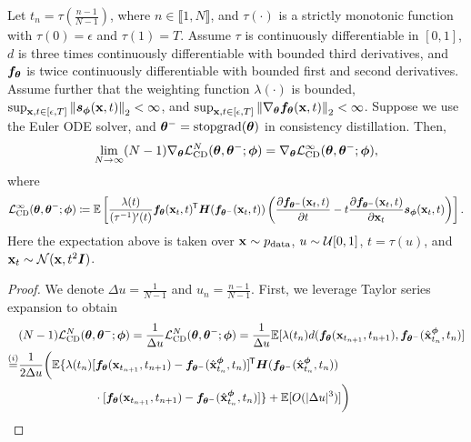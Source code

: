\begin{appendices}
\begin{theorem}\label{thm:ctcd2}
    Let $t_n = \tau(\frac{n-1}{N-1})$, where $n \in \llbracket 1, N \rrbracket$, and $\tau(\cdot)$ is a strictly monotonic function with $\tau(0) = \epsilon$ and $\tau(1) = T$. Assume $\tau$ is continuously differentiable in $[0,1]$, $d$ is three times continuously differentiable with bounded third derivatives, and ${\bm{f}}_{{\bm{\theta}}}$ is twice continuously differentiable with bounded first and second derivatives. Assume further that the weighting function $\lambda(\cdot)$ is bounded, $\sup_{{\mathbf{x}}, t\in[\epsilon,T]}\left\lVert{\bm{s}}_{\bm{\phi}}({\mathbf{x}}, t)\right\rVert_2 < \infty$, and $\sup_{{\mathbf{x}}, t\in[\epsilon, T]}\left\lVert\nabla_{\bm{\theta}} {\bm{f}}_{\bm{\theta}}({\mathbf{x}}, t)\right\rVert_2 < \infty$. Suppose we use the Euler ODE solver, and ${\bm{\theta}}^{-} = \operatorname{stopgrad}({\bm{\theta}})$ in consistency distillation. Then,
    \begin{align}
        \lim_{N \to \infty} (N-1) \nabla_{\bm{\theta}} \mathcal{L}_\text{CD}^N({\bm{\theta}}, {\bm{\theta}}^{-}; {\bm{\phi}}) = \nabla_{\bm{\theta}} \mathcal{L}_\text{CD}^\infty({\bm{\theta}}, {\bm{\theta}}^{-}; {\bm{\phi}}),\label{eq:ctcd_obj2}
    \end{align}
    where
    \begin{align}
        \mathcal{L}_\text{CD}^{\infty} ({\bm{\theta}}, {\bm{\theta}}^{-}; {\bm{\phi}}) \coloneqq \mathbb{E}\left[\frac{\lambda(t)}{(\tau^{-1})'(t)} {\bm{f}}_{\bm{\theta}}({\mathbf{x}}_t, t) ^{\mkern-1.5mu\mathsf{T}} {\bm{H}}({\bm{f}}_{{\bm{\theta}}^-}({\mathbf{x}}_t, t)) \left(\frac{\partial {\bm{f}}_{{\bm{\theta}}^-}({\mathbf{x}}_t, t)}{\partial t} - t \frac{\partial {\bm{f}}_{{\bm{\theta}}^-}({\mathbf{x}}_t, t)}{\partial {\mathbf{x}}_t} {\bm{s}}_{\bm{\phi}}({\mathbf{x}}_{t}, t)\right)\right].
    \end{align}
    Here the expectation above is taken over ${\mathbf{x}} \sim p_\text{data}$, $u \sim \mathcal{U}[0, 1]$, $t = \tau(u)$, and ${\mathbf{x}}_t \sim \mathcal{N}({\mathbf{x}}, t^2{\bm{I}})$.
\end{theorem}
\begin{proof}
    We denote $\Delta u = \frac{1}{N-1}$ and $u_n = \frac{n-1}{N-1}$. First, we leverage Taylor series expansion to obtain
    \begin{align}
        &(N-1)\mcal{L}_\text{CD}^N(\vtheta, \vtheta^{-}; \vphi) = \frac{1}{\Delta u}\mcal{L}_\text{CD}^N(\vtheta, \vtheta^{-}; \vphi) = \frac{1}{\Delta u} \mbb{E}[\lambda(t_n)d(\vf_\vtheta(\rvx_{t_{n+1}}, t_{n+1}), \vf_{\vtheta^{-}}(\hat{\rvx}_{t_n}^\vphi, t_n)]\notag \\
        \stackrel{(i)}{=}&\begin{multlined}[t][0.9\displaywidth]
            \frac{1}{2 \Delta u}\bigg(\mbb{E}\{\lambda(t_n)[\vf_\vtheta(\rvx_{t_{n+1}}, t_{n+1}) - \vf_{\vtheta^-}(\hat{\rvx}_{t_n}^\vphi, t_n)]\tran \mH(\vf_{\vtheta^{-}}(\hat{\rvx}_{t_n}^\vphi, t_n))\\\cdot [\vf_\vtheta(\rvx_{t_{n+1}}, t_{n+1}) - \vf_{\vtheta^{-}}(\hat{\rvx}_{t_n}^\vphi, t_n)]\} + \mbb{E}[O(|\Delta u|^3)]\bigg)

\end{multlined}
\end{align}
\end{proof}
\end{appendices}
